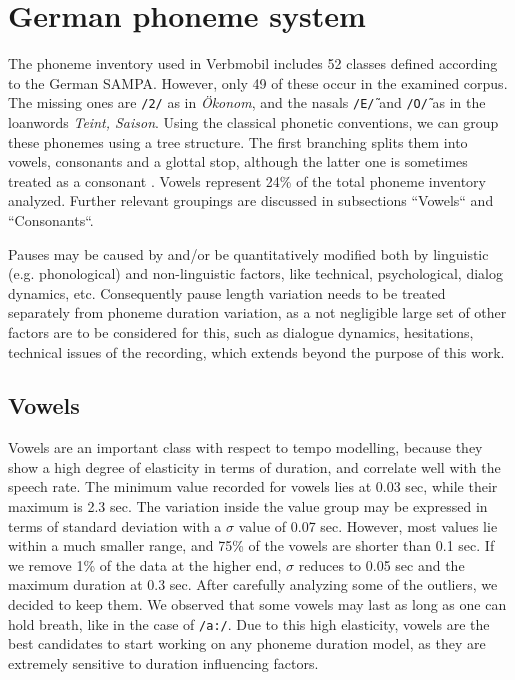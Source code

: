 \documentclass[11pt,a4paper]{scrbook}
\begin{document}
\chapter{German phoneme system}
The phoneme inventory used in Verbmobil includes 52 classes defined according to the German SAMPA. However, only 49 of these occur in the examined corpus. The missing ones are \texttt{/2/} as in \textit{Ökonom}, and the nasals \texttt{/E\~/} and \texttt{/O\~/} as in the loanwords \textit{Teint, Saison}. Using the classical phonetic conventions, we can group these phonemes using a tree structure. The first branching splits them into vowels, consonants and a glottal stop, although the latter one is sometimes treated as a consonant \cite{Kohler1995}. Vowels represent 24\% of the total phoneme inventory analyzed. Further relevant groupings are discussed in subsections ``Vowels`` and ``Consonants``.

Pauses may be caused by and/or be quantitatively modified both by linguistic (e.g. phonological) and non-linguistic factors, like technical, psychological, dialog dynamics, etc. Consequently pause length variation needs to be treated separately from phoneme duration variation, as a not negligible large set of other factors are to be considered for this, such as dialogue dynamics, hesitations, technical issues of the recording, which extends beyond the purpose of this work.

\section{Vowels}
Vowels are an important class with respect to tempo modelling, because they show a high degree of elasticity in terms of duration, and correlate well with the speech rate. The minimum value recorded for vowels lies at 0.03 sec, while their maximum is 2.3 sec. The variation inside the value group may be expressed in terms of standard deviation with a $\sigma$ value of 0.07 sec. However, most values lie within a much smaller range, and 75\% of the vowels are shorter than 0.1 sec. If we remove 1\% of the data at the higher end, $\sigma$ reduces to 0.05 sec and the maximum duration at 0.3 sec. After carefully analyzing some of the outliers, we decided to keep them. We observed that some vowels may last as long as one can hold breath, like in the case of \texttt{/a:/}. Due to this high elasticity, vowels are the best candidates to start working on any phoneme duration model, as they are extremely sensitive to duration influencing factors. 
\end{document}
